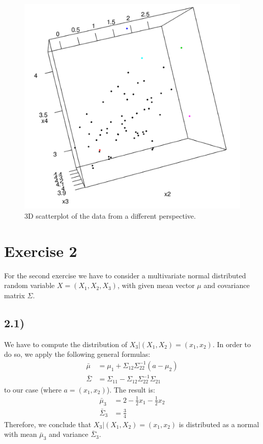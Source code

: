 \documentclass[a4paper,11pt,oneside]{report}
\begin{document}
	\begin{figure}[H]
	\centering
	\includegraphics[scale = 0.68]{3dplot2.png}
	\caption{3D scatterplot of the data from a different perspective.}
	\label{img:3Dscatter2}
	\end{figure}

\newpage
\section*{Exercise 2}
For the second exercise we have to consider a multivariate normal distributed random variable $X = (X_1, X_2, X_3)$, with given mean vector $\mu$ and covariance matrix $\Sigma$.
\subsection*{2.1)}
	We have to compute the distribution of $X_3|(X_1, X_2) = (x_1, x_2)$.
	In order to do so, we apply the following general formulas:
	\begin{align}
		\bar \mu &= \mu_1 + \Sigma_{12} \Sigma_{22}^{-1}(a - \mu_2) \label{eq:cond_mean} \\
		\bar \Sigma &= \Sigma_{11} - \Sigma_{12} \Sigma_{22}^{-1} \Sigma_{21} \label{eq:cond_Sigma}
	\end{align}
	to our case (where $a = (x_1, x_2)$). The result is:
	\begin{align}
		\bar \mu_3 &= 2 - \frac{1}{2}x_1 - \frac{1}{2}x_2 \nonumber \\
		\bar \Sigma_3 &= \frac{3}{4} \nonumber
	\end{align}
	Therefore, we conclude that $X_3|(X_1, X_2) = (x_1, x_2)$ is distributed as a normal with mean $\bar \mu_3$ and variance $\bar \Sigma_3$.
	
\end{document}
